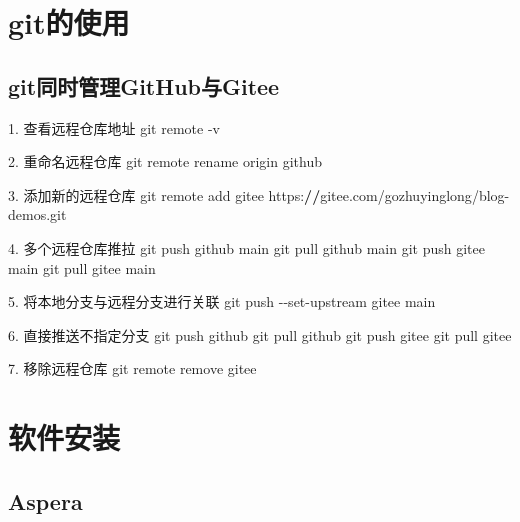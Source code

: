 \documentclass[
  10pt,
]{book}
\newenvironment{Shaded}{\begin{snugshade}}{\end{snugshade}}
\newcommand{\ErrorTok}[1]{\textcolor[rgb]{0.64,0.00,0.00}{\textbf{#1}}}
\newcommand{\FloatTok}[1]{\textcolor[rgb]{0.00,0.00,0.81}{#1}}
\newcommand{\NormalTok}[1]{#1}
\newcommand{\SpecialCharTok}[1]{\textcolor[rgb]{0.00,0.00,0.00}{#1}}
\begin{document}
\hypertarget{gitux7684ux4f7fux7528}{%
\section{git的使用}\label{gitux7684ux4f7fux7528}}

\hypertarget{gitux540cux65f6ux7ba1ux7406githubux4e0egitee}{%
\subsection{git同时管理GitHub与Gitee}\label{gitux540cux65f6ux7ba1ux7406githubux4e0egitee}}

\begin{Shaded}
\begin{Highlighting}[]
\FloatTok{1.}\NormalTok{ 查看远程仓库地址}
\NormalTok{git remote }\SpecialCharTok{{-}}\NormalTok{v}

\FloatTok{2.}\NormalTok{ 重命名远程仓库}
\NormalTok{git remote rename origin github}

\FloatTok{3.}\NormalTok{ 添加新的远程仓库}
\NormalTok{git remote add gitee https}\SpecialCharTok{:}\ErrorTok{//}\NormalTok{gitee.com}\SpecialCharTok{/}\NormalTok{gozhuyinglong}\SpecialCharTok{/}\NormalTok{blog}\SpecialCharTok{{-}}\NormalTok{demos.git}

\FloatTok{4.}\NormalTok{ 多个远程仓库推拉}
\NormalTok{git push github main}
\NormalTok{git pull github main}
\NormalTok{git push gitee main}
\NormalTok{git pull gitee main}

\FloatTok{5.}\NormalTok{ 将本地分支与远程分支进行关联}
\NormalTok{git push }\SpecialCharTok{{-}{-}}\NormalTok{set}\SpecialCharTok{{-}}\NormalTok{upstream gitee main}

\FloatTok{6.}\NormalTok{ 直接推送不指定分支}
\NormalTok{git push github}
\NormalTok{git pull github}
\NormalTok{git push gitee}
\NormalTok{git pull gitee}

\FloatTok{7.}\NormalTok{ 移除远程仓库}
\NormalTok{git remote remove gitee}
\end{Highlighting}
\end{Shaded}

\hypertarget{ux8f6fux4ef6ux5b89ux88c5}{%
\section{软件安装}\label{ux8f6fux4ef6ux5b89ux88c5}}

\hypertarget{aspera}{%
\subsection{Aspera}\label{aspera}}
\end{document}
